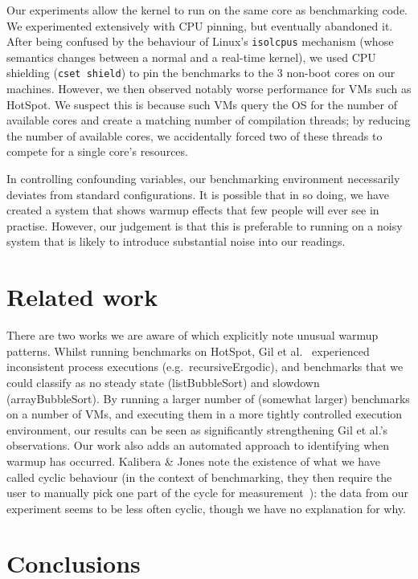 \documentclass[preprint,numbers,10pt]{sigplanconf}
\newcommand{\kalibera}{Kalibera \& Jones\xspace}
\begin{document}
Our experiments allow the kernel to run on the same core as benchmarking code.
We experimented extensively with CPU pinning, but eventually abandoned it. After
being confused by the behaviour of Linux's \texttt{isolcpus} mechanism (whose
semantics changes between a normal and a real-time kernel), we used CPU shielding
(\texttt{cset shield}) to pin the benchmarks to the 3 non-boot cores on our
machines. However, we then observed notably worse performance for VMs such as
HotSpot. We suspect this is because such VMs query the OS for the number of
available cores and create a matching number of compilation threads; by reducing
the number of available cores, we accidentally forced two of these threads to
compete for a single core's resources.

In controlling confounding variables, our benchmarking environment necessarily
deviates from standard configurations. It is possible that in so doing, we have
created a system that shows warmup effects that few people will ever see in
practise. However, our judgement is that this is preferable to running on a
noisy system that is likely to introduce substantial noise into our readings.


\section{Related work}

There are two works we are aware of which explicitly note unusual warmup
patterns. Whilst running benchmarks on HotSpot, Gil et
al.~\cite{gil11microbenchmark} experienced inconsistent process executions
(e.g.~recursiveErgodic), and benchmarks that we could classify as no
steady state (listBubbleSort) and slowdown (arrayBubbleSort). By running a
larger number of (somewhat larger) benchmarks on a number of VMs, and executing
them in a more tightly controlled execution environment, our results can be seen
as significantly strengthening Gil et al.'s observations. Our work also adds an
automated approach to identifying when warmup has occurred.
\kalibera note the
existence of what we have called cyclic behaviour (in the context of benchmarking,
they then require the user to
manually pick one part of the cycle for measurement~\cite{kalibera13rigorous}):
the data from our experiment seems to be less often cyclic, though we have no
explanation for why.


\section{Conclusions}
\label{sec:conclusion}
\end{document}
